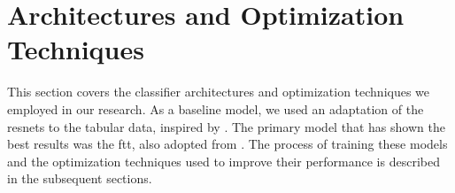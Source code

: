 \section{Architectures and Optimization Techniques}

This section covers the classifier architectures and optimization techniques we employed in our research. As a baseline
model, we used an adaptation of the \glspl{resnet} to the tabular data, inspired by \cite{tabular}. The primary model
that has shown the best results was the \gls{ftt}, also adopted from \cite{tabular}. The process of training these
models and the optimization techniques used to improve their performance is described in the subsequent sections.










